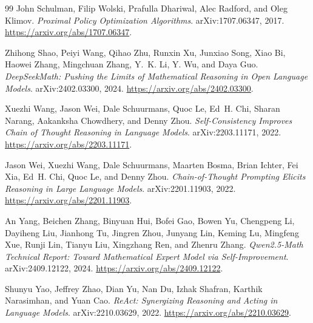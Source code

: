 \documentclass[11pt]{article}
\begin{document}
\begin{thebibliography}{99}
John Schulman, Filip Wolski, Prafulla Dhariwal, Alec Radford, and Oleg Klimov.
\newblock \emph{Proximal Policy Optimization Algorithms}.
\newblock arXiv:1707.06347, 2017.
\newblock \url{https://arxiv.org/abs/1707.06347}.

Zhihong Shao, Peiyi Wang, Qihao Zhu, Runxin Xu, Junxiao Song, Xiao Bi, Haowei Zhang, Mingchuan Zhang, Y.~K. Li, Y. Wu, and Daya Guo.
\newblock \emph{DeepSeekMath: Pushing the Limits of Mathematical Reasoning in Open Language Models}.
\newblock arXiv:2402.03300, 2024.
\newblock \url{https://arxiv.org/abs/2402.03300}.

Xuezhi Wang, Jason Wei, Dale Schuurmans, Quoc Le, Ed~H. Chi, Sharan Narang, Aakanksha Chowdhery, and Denny Zhou.
\newblock \emph{Self-Consistency Improves Chain of Thought Reasoning in Language Models}.
\newblock arXiv:2203.11171, 2022.
\newblock \url{https://arxiv.org/abs/2203.11171}.

Jason Wei, Xuezhi Wang, Dale Schuurmans, Maarten Bosma, Brian Ichter, Fei Xia, Ed~H. Chi, Quoc Le, and Denny Zhou.
\newblock \emph{Chain-of-Thought Prompting Elicits Reasoning in Large Language Models}.
\newblock arXiv:2201.11903, 2022.
\newblock \url{https://arxiv.org/abs/2201.11903}.

An Yang, Beichen Zhang, Binyuan Hui, Bofei Gao, Bowen Yu, Chengpeng Li, Dayiheng Liu, Jianhong Tu, Jingren Zhou, Junyang Lin, Keming Lu, Mingfeng Xue, Runji Lin, Tianyu Liu, Xingzhang Ren, and Zhenru Zhang.
\newblock \emph{Qwen2.5-Math Technical Report: Toward Mathematical Expert Model via Self-Improvement}.
\newblock arXiv:2409.12122, 2024.
\newblock \url{https://arxiv.org/abs/2409.12122}.

Shunyu Yao, Jeffrey Zhao, Dian Yu, Nan Du, Izhak Shafran, Karthik Narasimhan, and Yuan Cao.
\newblock \emph{ReAct: Synergizing Reasoning and Acting in Language Models}.
\newblock arXiv:2210.03629, 2022.
\newblock \url{https://arxiv.org/abs/2210.03629}.

\end{thebibliography}
\end{document}
